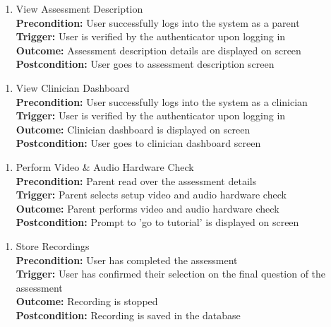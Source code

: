 \documentclass[12pt]{article}
\begin{document}
\begin{enumerate}[label={PUC-}09. ]
  \item View Assessment Description\\
  \textbf{Precondition: }User successfully logs into the system as a parent\\
  \textbf{Trigger: }User is verified by the authenticator upon logging in\\
  \textbf{Outcome: }Assessment description details are displayed on screen\\
  \textbf{Postcondition: }User goes to assessment description screen\\
\end{enumerate}

\begin{enumerate}[label={PUC-}10. ]
  \item View Clinician Dashboard\\
  \textbf{Precondition: }User successfully logs into the system as a clinician\\
  \textbf{Trigger: }User is verified by the authenticator upon logging in\\
  \textbf{Outcome: }Clinician dashboard is displayed on screen\\
  \textbf{Postcondition: }User goes to clinician dashboard screen\\
\end{enumerate}

\begin{enumerate}[label={PUC-}11. ]
  \item Perform Video \& Audio Hardware Check\\
  \textbf{Precondition: }Parent read over the assessment details\\
  \textbf{Trigger: }Parent selects setup video and audio hardware check\\
  \textbf{Outcome: }Parent performs video and audio hardware check\\
  \textbf{Postcondition: }Prompt to 'go to tutorial' is displayed on screen\\
\end{enumerate}

\begin{enumerate}[label={PUC-}12. ]
  \item Store Recordings\\
  \textbf{Precondition: }User has completed the assessment\\
  \textbf{Trigger: }User has confirmed their selection on the final question of the assessment\\
  \textbf{Outcome: }Recording is stopped\\
  \textbf{Postcondition: }Recording is saved in the database\\
\end{enumerate}
\end{document}

